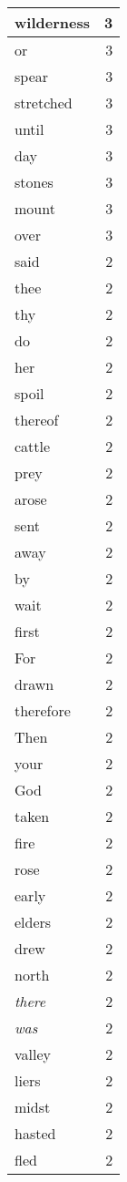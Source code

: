 \begin{center}
\begin{longtable}{l|r}
wilderness & 3\\ \hline 
or & 3\\ \hline 
spear & 3\\ \hline 
stretched & 3\\ \hline 
until & 3\\ \hline 
day & 3\\ \hline 
stones & 3\\ \hline 
mount & 3\\ \hline 
over & 3\\ \hline 
said & 2\\ \hline 
thee & 2\\ \hline 
thy & 2\\ \hline 
do & 2\\ \hline 
her & 2\\ \hline 
spoil & 2\\ \hline 
thereof & 2\\ \hline 
cattle & 2\\ \hline 
prey & 2\\ \hline 
arose & 2\\ \hline 
sent & 2\\ \hline 
away & 2\\ \hline 
by & 2\\ \hline 
wait & 2\\ \hline 
first & 2\\ \hline 
For & 2\\ \hline 
drawn & 2\\ \hline 
therefore & 2\\ \hline 
Then & 2\\ \hline 
your & 2\\ \hline 
God & 2\\ \hline 
taken & 2\\ \hline 
fire & 2\\ \hline 
rose & 2\\ \hline 
early & 2\\ \hline 
elders & 2\\ \hline 
drew & 2\\ \hline 
north & 2\\ \hline 
\emph{there} & 2\\ \hline 
\emph{was} & 2\\ \hline 
valley & 2\\ \hline 
liers & 2\\ \hline 
midst & 2\\ \hline 
hasted & 2\\ \hline 
fled & 2\\ \hline 

\end{longtable}
\end{center}
